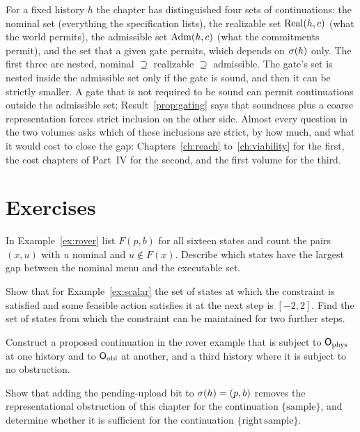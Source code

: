 For a fixed history $h$ the chapter has distinguished four sets of continuations: the nominal set (everything the specification lists), the realizable set $\operatorname{Real}(h,c)$ (what the world permits), the admissible set $\operatorname{Adm}(h,c)$ (what the commitments permit), and the set that a given gate permits, which depends on $\sigma(h)$ only. The first three are nested, nominal $\supseteq$ realizable $\supseteq$ admissible. The gate's set is nested inside the admissible set only if the gate is sound, and then it can be strictly smaller. A gate that is not required to be sound can permit continuations outside the admissible set; Result~\ref{prop:gating} says that soundness plus a coarse representation forces strict inclusion on the other side. Almost every question in the two volumes asks which of these inclusions are strict, by how much, and what it would cost to close the gap: Chapters~\ref{ch:reach} to~\ref{ch:viability} for the first, the cost chapters of Part~IV for the second, and the first volume for the third.

\section*{Exercises}

\begin{exercise}
In Example~\ref{ex:rover} list $F(p,b)$ for all sixteen states and count the pairs $(x,u)$ with $u$ nominal and $u\notin F(x)$. Describe which states have the largest gap between the nominal menu and the executable set.
\end{exercise}

\begin{exercise}
Show that for Example~\ref{ex:scalar} the set of states at which the constraint is satisfied and some feasible action satisfies it at the next step is $[-2,2]$. Find the set of states from which the constraint can be maintained for two further steps.
\end{exercise}

\begin{exercise}
Construct a proposed continuation in the rover example that is subject to $\mathsf{O}_{\mathrm{phys}}$ at one history and to $\mathsf{O}_{\mathrm{obl}}$ at another, and a third history where it is subject to no obstruction.
\end{exercise}

\begin{exercise}
Show that adding the pending-upload bit to $\sigma(h)=(p,b)$ removes the representational obstruction of this chapter for the continuation $\{\mathrm{sample}\}$, and determine whether it is sufficient for the continuation $\{\mathrm{right}\,\mathrm{sample}\}$.
\end{exercise}


